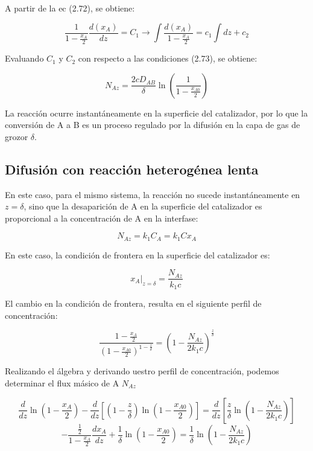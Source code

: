 A partir de la ec (2.72), se obtiene:

\begin{equation*}
    \frac{1}{1-\frac{x_A}{2}}\frac{d(x_A)}{dz}=C_1\longrightarrow \int\frac{d(x_A)}{1-\frac{x_A}{2}}=c_1\int dz +c_2
\end{equation*}

Evaluando $C_1$ y $C_2$ con respecto a las condiciones (2.73), se obtiene:

\begin{equation}
    N_{Az}=\frac{2cD_{AB}}{\delta}\ln(\frac{1}{1-\frac{x_{A0}}{2}})
\end{equation}

La reacción ocurre instantáneamente en la superficie del catalizador, por lo que la conversión de A a B es un proceso regulado por la difusión en la capa de gas de grozor $\delta$. 

\subsection{Difusión con reacción heterogénea lenta}

En este caso, para el mismo sistema, la reacción no sucede instantáneamente en $z=\delta$, sino que la desaparición de A en la superficie del catalizador es proporcional a la concentración de A en la interfase:

\begin{equation}
    N_{Az}=k_1C_A=k_1Cx_A
\end{equation}

En este caso, la condición de frontera en la superficie del catalizador es:

\begin{equation*}
    x_A|_{z=\delta}=\frac{N_{Az}}{k_1c}
\end{equation*}

El cambio en la condición de frontera, resulta en el siguiente perfil de concentración:

\begin{equation}
    \frac{1-\frac{x_A}{2}}{(1-\frac{x_{A0}}{2})^{1-\frac{z}{\delta}}}=(1-\frac{N_{Az}}{2k_1c})^{\frac{z}{\delta}}
\end{equation}

Realizando el álgebra y derivando uestro perfil de concentración, podemos determinar el flux másico de A $N_{Az}$

\begin{equation*}
    \frac{d}{dz}\ln(1-\frac{x_A}{2})-\frac{d}{dz}[(1-\frac{z}{\delta})\ln(1-\frac{x_{A0}}{2})]=\frac{d}{dz}[\frac{z}{\delta}\ln (1-\frac{N_{Az}}{2k_1c})]
\end{equation*}
\begin{equation}
    -\frac{\frac{1}{2}}{1-\frac{x_A}{2}}\frac{dx_A}{dz}+\frac{1}{\delta}\ln (1-\frac{x_{A0}}{2})=\frac{1}{\delta}\ln (1-\frac{N_{Az}}{2k_1c})
\end{equation}


